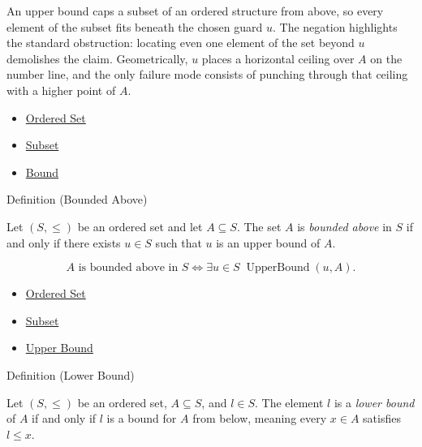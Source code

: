 \begin{remark*}[Interpretation]
An upper bound caps a subset of an ordered structure from above, so every element of the subset fits beneath the chosen guard $u$. The negation highlights the standard obstruction: locating even one element of the set beyond $u$ demolishes the claim. Geometrically, $u$ places a horizontal ceiling over $A$ on the number line, and the only failure mode consists of punching through that ceiling with a higher point of $A$.
\end{remark*}

\begin{dependencies}
\begin{itemize}
  \item \hyperref[def:ordered-set]{Ordered Set}
  \item \hyperref[def:subset]{Subset}
  \item \hyperref[def:bound]{Bound}
\end{itemize}
\end{dependencies}

\begin{definitionbox}{Definition (Bounded Above)}
\begin{definition}
\label{def:bounded-above}
Let $(S,\le)$ be an ordered set and let $A\subseteq S$. The set $A$ is \emph{bounded above} in $S$ if and only if there exists $u\in S$ such that $u$ is an upper bound of $A$.
\end{definition}
\end{definitionbox}

\begin{remark*}
\[
A\text{ is bounded above in }S
\Longleftrightarrow
\exists u\in S\;\operatorname{UpperBound}(u,A).
\]
\end{remark*}

\begin{dependencies}
\begin{itemize}
  \item \hyperref[def:ordered-set]{Ordered Set}
  \item \hyperref[def:subset]{Subset}
  \item \hyperref[def:upper-bound]{Upper Bound}
\end{itemize}
\end{dependencies}

\begin{definitionbox}{Definition (Lower Bound)}
\begin{definition}
\label{def:lower-bound}
Let $(S,\le)$ be an ordered set, $A\subseteq S$, and $l\in S$. The element $l$ is a \emph{lower bound} of $A$ if and only if $l$ is a bound for $A$ from below, meaning every $x\in A$ satisfies $l\le x$.
\end{definition}
\end{definitionbox}

